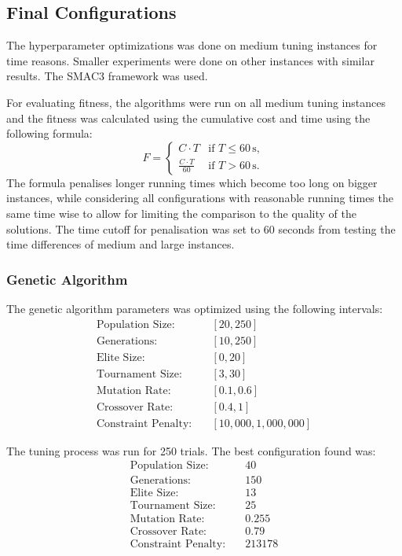 \documentclass{article}
\begin{document}
\subsection{Final Configurations}
The hyperparameter optimizations was done on medium tuning instances for time reasons. Smaller experiments were done on other instances with similar results.
The SMAC3 framework was used.

For evaluating fitness, the algorithms were run on all medium tuning instances and the fitness was calculated using the cumulative cost and time using the following formula:
\[
F =
\begin{cases}
	C \cdot T & \text{if } T \leq 60 \, \text{s}, \\
	\frac{C \cdot T}{60} & \text{if } T > 60 \, \text{s}.
\end{cases}
\]
The formula penalises longer running times which become too long on bigger instances, while considering all configurations with reasonable running times the same time wise to
allow for limiting the comparison to the quality of the solutions. The time cutoff for penalisation was set to 60 seconds from testing the time differences of medium and large instances.

\subsubsection{Genetic Algorithm}
The genetic algorithm parameters was optimized using the following intervals:
\begin{align*}
	\text{Population Size:} & \quad [20, 250] \\
	\text{Generations:} & \quad [10, 250] \\
	\text{Elite Size:} & \quad [0, 20] \\
	\text{Tournament Size:} & \quad [3, 30] \\
	\text{Mutation Rate:} & \quad [0.1, 0.6] \\
	\text{Crossover Rate:} & \quad [0.4, 1] \\
	\text{Constraint Penalty:} & \quad [10{,}000, 1{,}000{,}000]
\end{align*}

The tuning process was run for 250 trials. The best configuration found was:
\begin{align*}
	\text{Population Size:} & \quad 40 \\
	\text{Generations:} & \quad 150 \\
	\text{Elite Size:} & \quad 13 \\
	\text{Tournament Size:} & \quad 25 \\
	\text{Mutation Rate:} & \quad 0.255 \\
	\text{Crossover Rate:} & \quad 0.79 \\
	\text{Constraint Penalty:} & \quad 213178
\end{align*}
\end{document}
